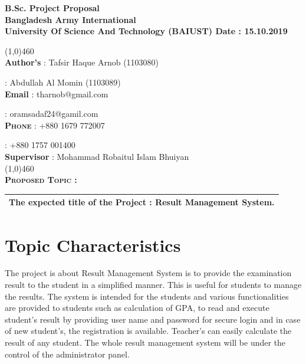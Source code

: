 \documentclass{article}
\begin{document}
	\begin{titlepage}
	\textbf{\large \textbf{B.Sc. Project Proposal}}\\
	
	
	\textbf{\large Bangladesh Army International }\\
	
	\textbf{\large University Of Science And Technology (BAIUST) \hspace{50pt} Date : 15.10.2019}
	
	\line(1,0){460}	 \\
	
	
	\large \textbf{Author’s} \hspace{.5cm}     : Tafsir Haque Arnob                      (1103080) 
	
	{\large \hspace{2.6cm}: Abdullah Al Momin  (1103089)}\\
	
	{\large \textbf{Email} \hspace{1.1cm} : tharnob@gmail.com }
	
	{\large \hspace{2.5cm} :   oramsadaf24@gamil.com}\\
	
	
	
	\textsc{\large \textbf{Phone} \hspace{1cm} : +880 1679 772007}
	
	\textsc{\large \hspace{2.5cm} : +880 1757 001400}\\
	
	{\large \textbf{Supervisor} \hspace{0.05cm} : Mohammad Robaitul Islam Bhuiyan} \\
	
	\line(1,0){460}	 \\
	
	\textsc{\large \textbf{Proposed Topic :}}\\
	
	\begin{tabular}{|c|}
		\hline
		\textbf{The expected title of the Project :}  Result Management System.\\
		\hline
	
	
	\end{tabular}		
	
	
	
	
\section{Topic Characteristics}\label{sec intro}
The project is about Result Management System is to provide the examination result to the student in a simplified manner. This is useful for students to manage the results. 
The system is intended for the students and various functionalities are provided to students such as calculation of GPA, to read and execute student’s result by providing user name and password for secure login and in case of new student’s, the registration is available. Teacher’s  can easily calculate  the result  of any student. The whole result management system will be under the control of the administrator panel. 



\end{titlepage}
\end{document}
